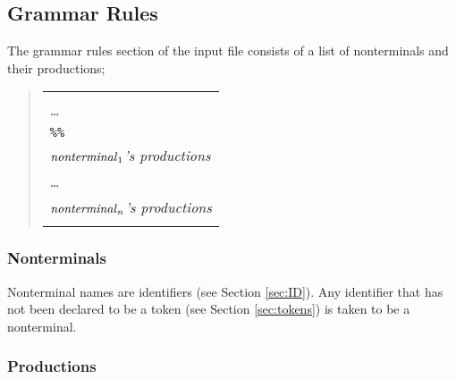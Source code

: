 \documentclass{article}
\begin{document}
\subsection{Grammar Rules}

The grammar rules section of the input file consists of a list of
nonterminals and their productions;
%
\begin{quote}
\begin{tabular}{|l|}\hline
\begin{minipage}{3.5in}
\ \\
\ldots\\
{\tt \%\%}\\
{\em ${\it nonterminal}_1$'s productions}\\
\ldots\\
{\em ${\it nonterminal}_n$'s productions}\\
\end{minipage}
\\ \hline
\end{tabular}
\end{quote}

\subsubsection{Nonterminals}

Nonterminal names are identifiers (see Section \ref{sec:ID}).  Any
identifier that has not been declared to be a token (see Section
\ref{sec:tokens}) is taken to be a nonterminal.

\subsubsection{Productions}
\end{document}
